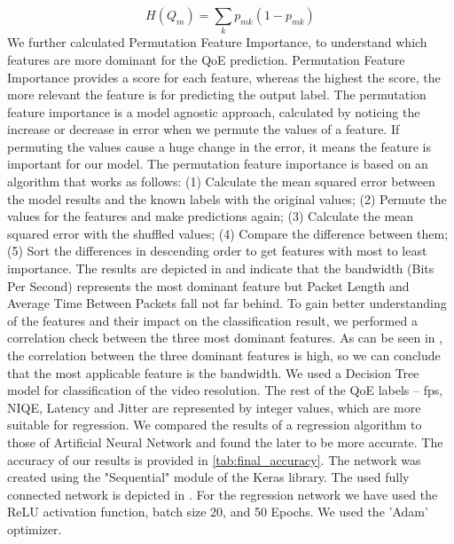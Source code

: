 \begin{equation}
    H(Q_m) = \sum_k p_{mk}(1-p_{mk})
    \label{eq:hqm}
\end{equation}
We further calculated Permutation Feature Importance, to understand which features are more dominant for the QoE prediction. Permutation Feature Importance provides a score for each feature, whereas the highest the score, the more relevant the feature is for predicting the output label. The permutation feature importance is a model agnostic approach, calculated by noticing the increase or decrease in error when we permute the values of a feature. If permuting the values cause a huge change in the error, it means the feature is important for our model. The permutation feature importance is based on an algorithm that works as follows: (1) Calculate the mean squared error between the model results and the known labels with the original values; (2) Permute the values for the features and make predictions again; (3) Calculate the mean squared error with the shuffled values; (4) Compare the difference between them; (5) Sort the differences in descending order to get features with most to least importance.
The results are depicted in  and indicate that the bandwidth (Bits Per Second) represents the most dominant feature but Packet Length and Average Time Between Packets fall not far behind.
To gain better understanding of the features and their impact on the classification result, we performed a correlation check between the three most dominant features. As can be seen in , the correlation between the three dominant features is high, so we can conclude that the most applicable feature is the bandwidth. We used a Decision Tree model for classification of the video resolution. The rest of the QoE labels – fps, NIQE, Latency and Jitter are represented by integer values, which are more suitable for regression. We compared the results of a regression algorithm to those of Artificial Neural Network and found the later to be more accurate. The accuracy of our results is provided in \cref{tab:final_accuracy}. The network was created using the "Sequential" module of the Keras library. The used fully connected network is depicted in .
For the regression network we have used the ReLU activation function, batch size 20, and 50 Epochs. We used the 'Adam' optimizer.
